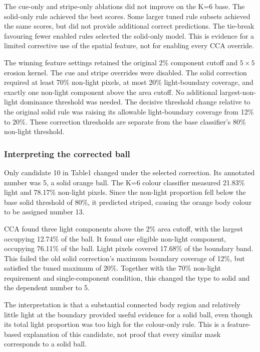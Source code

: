 The cue-only and stripe-only ablations did not improve on the K=6 base.
The solid-only rule achieved the best scores. Some larger tuned rule
subsets achieved the same scores, but did not provide additional correct
predictions. The tie-break favouring fewer enabled rules selected the
solid-only model. This is evidence for a limited corrective use of the
spatial feature, not for enabling every CCA override.



The winning feature settings retained the original 2\% component cutoff
and $5\times5$ erosion kernel. The cue and stripe overrides were disabled.
The solid correction required at least 70\% non-light pixels, at most
20\% light-boundary coverage, and exactly one non-light component above
the area cutoff. No additional largest-non-light dominance threshold was
needed. The decisive threshold change relative to the original solid
rule was raising its allowable light-boundary coverage from 12\% to 20\%.
These correction thresholds are separate from the base classifier's 80\%
non-light threshold.

\subsubsection{Interpreting the corrected ball}



Only candidate 10 in Table1 changed under the selected correction. Its
annotated number was 5, a solid orange ball. The K=6 colour classifier
measured 21.83\% light and 78.17\% non-light pixels. Since the non-light
proportion fell below the base solid threshold of 80\%, it predicted
striped, causing the orange body colour to be assigned number 13.

CCA found three light components above the 2\% area cutoff, with the
largest occupying 12.74\% of the ball. It found one eligible non-light
component, occupying 76.11\% of the ball. Light pixels covered 17.68\%
of the boundary band. This failed the old solid correction's maximum
boundary coverage of 12\%, but satisfied the tuned maximum of 20\%.
Together with the 70\% non-light requirement and single-component
condition, this changed the type to solid and the dependent number to 5.

The interpretation is that a substantial connected body region and
relatively little light at the boundary provided useful evidence for a
solid ball, even though its total light proportion was too high for the
colour-only rule. This is a feature-based explanation of this candidate,
not proof that every similar mask corresponds to a solid ball.

